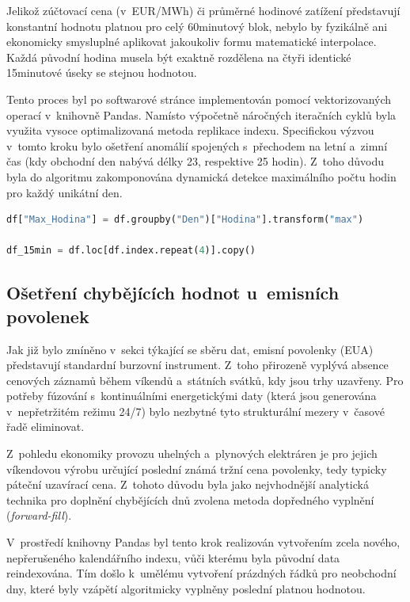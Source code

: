 \documentclass[a4paper]{article}
\begin{document}
Jelikož zúčtovací cena (v~EUR/MWh) či průměrné hodinové zatížení představují konstantní hodnotu platnou pro celý 60minutový blok, nebylo by fyzikálně ani ekonomicky smysluplné aplikovat jakoukoliv formu matematické interpolace. Každá původní hodina musela být exaktně rozdělena na čtyři identické 15minutové úseky se stejnou hodnotou.

Tento proces byl po softwarové stránce implementován pomocí vektorizovaných operací v~knihovně Pandas. Namísto výpočetně náročných iteračních cyklů byla využita vysoce optimalizovaná metoda replikace indexu. Specifickou výzvou v~tomto kroku bylo ošetření anomálií spojených s~přechodem na letní a~zimní čas (kdy obchodní den nabývá délky 23, respektive 25 hodin). Z~toho důvodu byla do algoritmu zakomponována dynamická detekce maximálního počtu hodin pro každý unikátní den.

\begin{lstlisting}[language=Python, caption={Vektorizovaná transformace hodinových dat na 15minutové bloky}]
df["Max_Hodina"] = df.groupby("Den")["Hodina"].transform("max")

df_15min = df.loc[df.index.repeat(4)].copy()
\end{lstlisting}

\subsection{Ošetření chybějících hodnot u~emisních povolenek}
Jak již bylo zmíněno v~sekci týkající se sběru dat, emisní povolenky (EUA) představují standardní burzovní instrument. Z~toho přirozeně vyplývá absence cenových záznamů během víkendů a~státních svátků, kdy jsou trhy uzavřeny. Pro potřeby fúzování s~kontinuálními energetickými daty (která jsou generována v~nepřetržitém režimu 24/7) bylo nezbytné tyto strukturální mezery v~časové řadě eliminovat.

Z~pohledu ekonomiky provozu uhelných a~plynových elektráren je pro jejich víkendovou výrobu určující poslední známá tržní cena povolenky, tedy typicky páteční uzavírací cena. Z~tohoto důvodu byla jako nejvhodnější analytická technika pro doplnění chybějících dnů zvolena metoda dopředného vyplnění (\textit{forward-fill}).

V~prostředí knihovny Pandas byl tento krok realizován vytvořením zcela nového, nepřerušeného kalendářního indexu, vůči kterému byla původní data reindexována. Tím došlo k~umělému vytvoření prázdných řádků pro neobchodní dny, které byly vzápětí algoritmicky vyplněny poslední platnou hodnotou.
\end{document}
